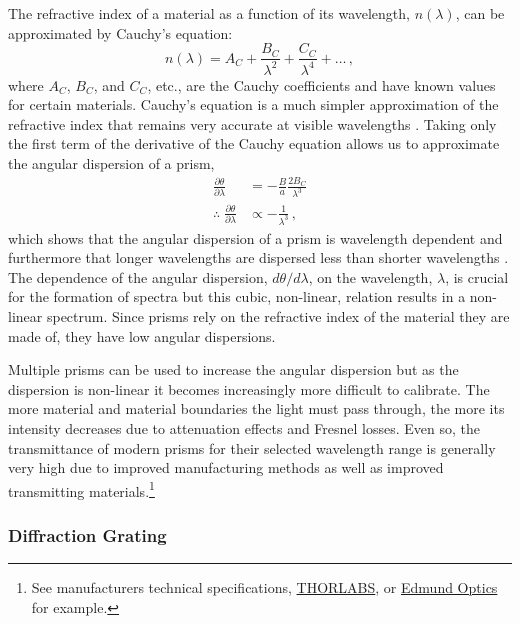 The refractive index of a material as a function of its wavelength, $n(\lambda)$, can be approximated by Cauchy's equation:
\begin{equation} \label{eq:Cauchy}
    n(\lambda) = A_{C} + \frac{B_{C}}{\lambda^{2}} + \frac{C_{C}}{\lambda^{4}} + \dots\,,
\end{equation}
where $A_{C}$, $B_{C}$, and $C_{C}$, etc., are the Cauchy coefficients and have known values for certain materials.
Cauchy's equation is a much simpler approximation of the refractive index that remains very accurate at visible wavelengths \citep{JenkinsOptics}.
Taking only the first term of the derivative of the Cauchy equation allows us to approximate the angular dispersion of a prism,
\begin{equation} \label{eq:prism_angular_dispersion_approx}
    \begin{aligned}
        \frac{\partial \theta}{\partial \lambda} &= -\frac{B}{a}\frac{2B_{C}}{\lambda^{3}} \\
        \therefore\; \frac{\partial \theta}{\partial \lambda} &\propto -\frac{1}{\lambda^{3}}\,,
    \end{aligned}
\end{equation}
which shows that the angular dispersion of a prism is wavelength dependent and furthermore that longer wavelengths are dispersed less than shorter wavelengths \citep{BirneyObsAstro, Hecht_optics}.
The dependence of the angular dispersion, $d\theta/d\lambda$, on the wavelength, $\lambda$, is crucial for the formation of spectra but this cubic, non-linear, relation results in a non-linear spectrum.
Since prisms rely on the refractive index of the material they are made of, they have low angular dispersions.

Multiple prisms can be used to increase the angular dispersion but as the dispersion is non-linear it becomes increasingly more difficult to calibrate.
The more material and material boundaries the light must pass through, the more its intensity decreases due to attenuation effects and Fresnel losses.
Even so, the transmittance of modern prisms for their selected wavelength range is generally very high due to improved manufacturing methods as well as improved transmitting materials.\footnote{See manufacturers technical specifications, \href{https://www.thorlabs.com/newgrouppage9.cfm?objectgroup_id=148}{THORLABS}, or \href{https://www.edmundoptics.eu/c/prisms/607/}{Edmund Optics} for example.}

\subsubsection{Diffraction Grating} \label{subsubsec:diff_grat}

